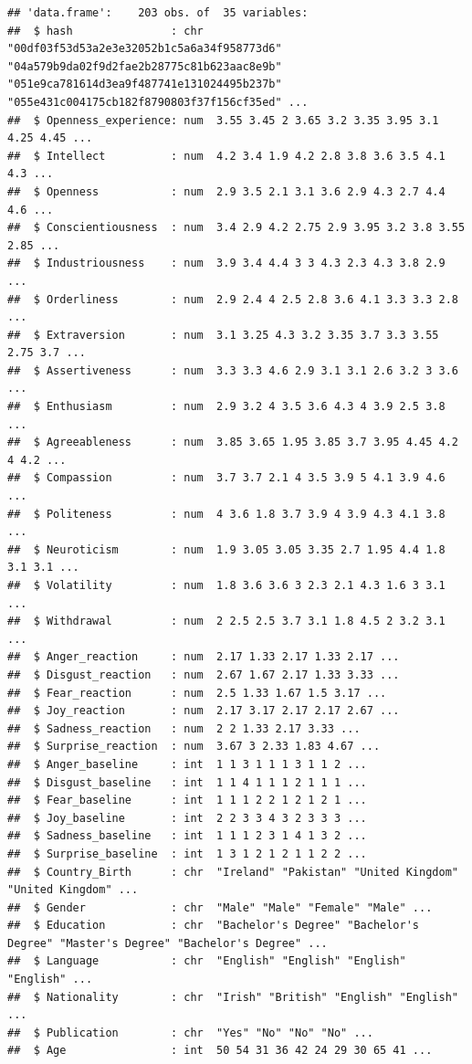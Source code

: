 \documentclass[
]{book}
\begin{document}
\begin{verbatim}
## 'data.frame':    203 obs. of  35 variables:
##  $ hash               : chr  "00df03f53d53a2e3e32052b1c5a6a34f958773d6" "04a579b9da02f9d2fae2b28775c81b623aac8e9b" "051e9ca781614d3ea9f487741e131024495b237b" "055e431c004175cb182f8790803f37f156cf35ed" ...
##  $ Openness_experience: num  3.55 3.45 2 3.65 3.2 3.35 3.95 3.1 4.25 4.45 ...
##  $ Intellect          : num  4.2 3.4 1.9 4.2 2.8 3.8 3.6 3.5 4.1 4.3 ...
##  $ Openness           : num  2.9 3.5 2.1 3.1 3.6 2.9 4.3 2.7 4.4 4.6 ...
##  $ Conscientiousness  : num  3.4 2.9 4.2 2.75 2.9 3.95 3.2 3.8 3.55 2.85 ...
##  $ Industriousness    : num  3.9 3.4 4.4 3 3 4.3 2.3 4.3 3.8 2.9 ...
##  $ Orderliness        : num  2.9 2.4 4 2.5 2.8 3.6 4.1 3.3 3.3 2.8 ...
##  $ Extraversion       : num  3.1 3.25 4.3 3.2 3.35 3.7 3.3 3.55 2.75 3.7 ...
##  $ Assertiveness      : num  3.3 3.3 4.6 2.9 3.1 3.1 2.6 3.2 3 3.6 ...
##  $ Enthusiasm         : num  2.9 3.2 4 3.5 3.6 4.3 4 3.9 2.5 3.8 ...
##  $ Agreeableness      : num  3.85 3.65 1.95 3.85 3.7 3.95 4.45 4.2 4 4.2 ...
##  $ Compassion         : num  3.7 3.7 2.1 4 3.5 3.9 5 4.1 3.9 4.6 ...
##  $ Politeness         : num  4 3.6 1.8 3.7 3.9 4 3.9 4.3 4.1 3.8 ...
##  $ Neuroticism        : num  1.9 3.05 3.05 3.35 2.7 1.95 4.4 1.8 3.1 3.1 ...
##  $ Volatility         : num  1.8 3.6 3.6 3 2.3 2.1 4.3 1.6 3 3.1 ...
##  $ Withdrawal         : num  2 2.5 2.5 3.7 3.1 1.8 4.5 2 3.2 3.1 ...
##  $ Anger_reaction     : num  2.17 1.33 2.17 1.33 2.17 ...
##  $ Disgust_reaction   : num  2.67 1.67 2.17 1.33 3.33 ...
##  $ Fear_reaction      : num  2.5 1.33 1.67 1.5 3.17 ...
##  $ Joy_reaction       : num  2.17 3.17 2.17 2.17 2.67 ...
##  $ Sadness_reaction   : num  2 2 1.33 2.17 3.33 ...
##  $ Surprise_reaction  : num  3.67 3 2.33 1.83 4.67 ...
##  $ Anger_baseline     : int  1 1 3 1 1 1 3 1 1 2 ...
##  $ Disgust_baseline   : int  1 1 4 1 1 1 2 1 1 1 ...
##  $ Fear_baseline      : int  1 1 1 2 2 1 2 1 2 1 ...
##  $ Joy_baseline       : int  2 2 3 3 4 3 2 3 3 3 ...
##  $ Sadness_baseline   : int  1 1 1 2 3 1 4 1 3 2 ...
##  $ Surprise_baseline  : int  1 3 1 2 1 2 1 1 2 2 ...
##  $ Country_Birth      : chr  "Ireland" "Pakistan" "United Kingdom" "United Kingdom" ...
##  $ Gender             : chr  "Male" "Male" "Female" "Male" ...
##  $ Education          : chr  "Bachelor's Degree" "Bachelor's Degree" "Master's Degree" "Bachelor's Degree" ...
##  $ Language           : chr  "English" "English" "English" "English" ...
##  $ Nationality        : chr  "Irish" "British" "English" "English" ...
##  $ Publication        : chr  "Yes" "No" "No" "No" ...
##  $ Age                : int  50 54 31 36 42 24 29 30 65 41 ...
\end{verbatim}
\end{document}
